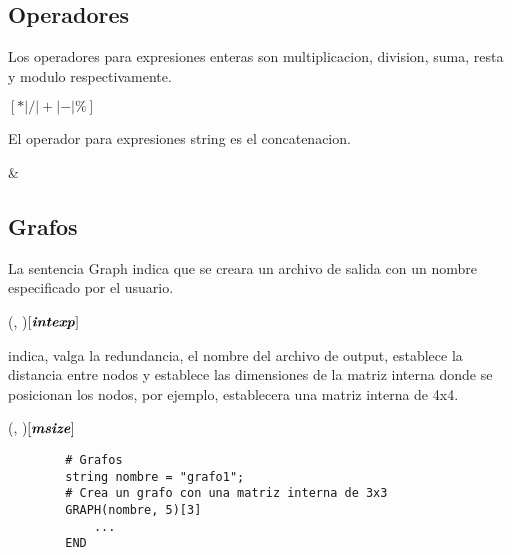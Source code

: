 \documentclass{article}
\begin{document}
    \subsection{Operadores}
    Los operadores para expresiones enteras son multiplicacion, division, suma, resta y modulo respectivamente.
    \begin{center}
         $\left[*|/|+|-|\%\right]$ 
    \end{center}
    El operador para expresiones string es el concatenacion.
    \begin{center}
         \& 
    \end{center}

    \subsection{Grafos}
    La sentencia Graph indica que se creara un archivo de salida con un nombre especificado por el usuario. 
    \begin{center}
        (, )$\left[\textbf{\textit{intexp}}\right]$
            \begin{center}  \end{center}
        \quad\quad\quad\quad\quad\quad\quad\quad\quad\quad\quad\quad\quad\quad\quad
    \end{center}

     indica, valga la redundancia, el nombre del archivo de output,  establece la distancia entre nodos y
     establece las dimensiones de la matriz interna donde se posicionan los nodos, por ejemplo,  establecera
    una matriz interna de 4x4. \par
    \begin{center}
        (, )$\left[\textbf{\textit{msize}}\right]$
    \end{center}

    \begin{lstlisting}
        # Grafos
        string nombre = "grafo1";
        # Crea un grafo con una matriz interna de 3x3
        GRAPH(nombre, 5)[3]
            ...
        END 
    \end{lstlisting}
\end{document}

